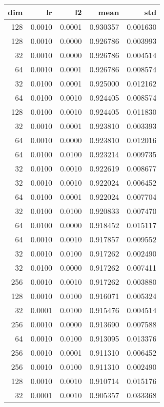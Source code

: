 \begin{tabular}{rrrrr}
\toprule
 dim &      lr &      l2 &      mean &       std \\
\midrule
 128 &  0.0010 &  0.0001 &  0.930357 &  0.001630 \\
 128 &  0.0010 &  0.0000 &  0.926786 &  0.003993 \\
  32 &  0.0010 &  0.0000 &  0.926786 &  0.004514 \\
  64 &  0.0010 &  0.0001 &  0.926786 &  0.008574 \\
  32 &  0.0100 &  0.0001 &  0.925000 &  0.012162 \\
  64 &  0.0100 &  0.0010 &  0.924405 &  0.008574 \\
 128 &  0.0100 &  0.0010 &  0.924405 &  0.011830 \\
  32 &  0.0010 &  0.0001 &  0.923810 &  0.003393 \\
  64 &  0.0010 &  0.0000 &  0.923810 &  0.012016 \\
  64 &  0.0100 &  0.0100 &  0.923214 &  0.009735 \\
  32 &  0.0100 &  0.0010 &  0.922619 &  0.008677 \\
  32 &  0.0010 &  0.0010 &  0.922024 &  0.006452 \\
  64 &  0.0100 &  0.0001 &  0.922024 &  0.007704 \\
  32 &  0.0100 &  0.0100 &  0.920833 &  0.007470 \\
  64 &  0.0100 &  0.0000 &  0.918452 &  0.015117 \\
  64 &  0.0010 &  0.0010 &  0.917857 &  0.009552 \\
  32 &  0.0010 &  0.0100 &  0.917262 &  0.002490 \\
  32 &  0.0100 &  0.0000 &  0.917262 &  0.007411 \\
 256 &  0.0010 &  0.0010 &  0.917262 &  0.003880 \\
 128 &  0.0010 &  0.0100 &  0.916071 &  0.005324 \\
  32 &  0.0001 &  0.0100 &  0.915476 &  0.004514 \\
 256 &  0.0010 &  0.0000 &  0.913690 &  0.007588 \\
  64 &  0.0010 &  0.0100 &  0.913095 &  0.013376 \\
 256 &  0.0010 &  0.0001 &  0.911310 &  0.006452 \\
 256 &  0.0010 &  0.0100 &  0.911310 &  0.002490 \\
 128 &  0.0010 &  0.0010 &  0.910714 &  0.015176 \\
  32 &  0.0001 &  0.0010 &  0.905357 &  0.033368 \\

\end{tabular}
